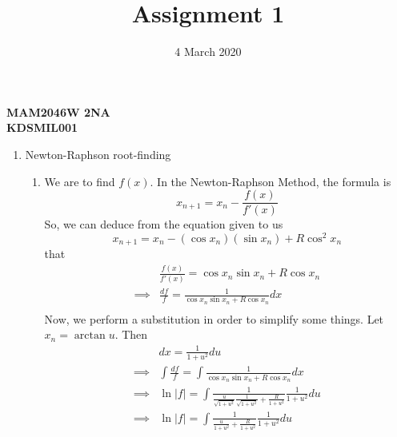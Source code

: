 \documentclass[12pt]{article}
\title{Assignment 1}
\date{4 March 2020}
\author{}
\begin{document}
    \begin{titlepage}
        \maketitle
        \center
        \textbf{\large{MAM2046W 2NA}}\\[12pt]
        \textbf{\large{KDSMIL001}}\\
    \end{titlepage}

    \begin{enumerate}
        \item Newton-Raphson root-finding
        \begin{enumerate}
            \item We are to find $f(x)$. In the Newton-Raphson Method, the formula is 
            \begin{equation*}
                x_{n+1} = x_n - \frac{f(x)}{f'(x)}
            \end{equation*}
            So, we can deduce from the equation given to us
            \begin{equation*}
                x_{n+1} = x_n - (\cos x_n)(\sin x_n) + R\cos^2 x_n
            \end{equation*}
            that
            \begin{equation*}
                \begin{split}
                    &\frac{f(x)}{f'(x)} = \cos x_n \sin x_n + R\cos x_n \\
                    \implies &\frac{df}{f} = \frac{1}{\cos x_n \sin x_n + R\cos x_n}dx \\
                \end{split}
            \end{equation*}
            Now, we perform a substitution in order to simplify some things. Let $x_n = \arctan u$. Then
            \begin{equation*}
                \begin{split}
                    &dx = \frac{1}{1+u^2}du \\
                    \implies &\int\frac{df}{f} = \int\frac{1}{\cos x_n \sin x_n + R\cos x_n}dx \\
                    \implies &\ln|f| = \int\frac{1}{\frac{u}{\sqrt{1+u^2}}\frac{1}{\sqrt{1+u^2}} + \frac{R}{1+u^2}}\frac{1}{1+u^2}du \\
                    \implies &\ln|f| = \int\frac{1}{\frac{u}{1+u^2} + \frac{R}{1+u^2}}\frac{1}{1+u^2}du \\

\end{split}
\end{equation*}
\end{enumerate}
\end{enumerate}
\end{document}
